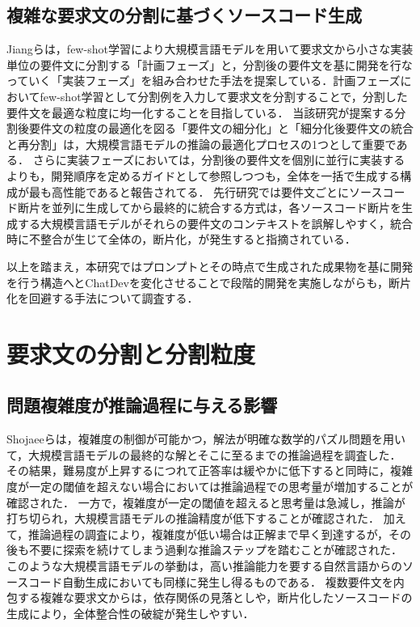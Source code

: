 \documentclass[11pt]{jreport}
\begin{document}
\subsection{複雑な要求文の分割に基づくソースコード生成}
Jiangら\cite{TOSEM}は，few-shot学習により大規模言語モデルを用いて要求文から小さな実装単位の要件文に分割する「計画フェーズ」と，分割後の要件文を基に開発を行なっていく「実装フェーズ」を組み合わせた手法を提案している．計画フェーズにおいてfew-shot学習として分割例を入力して要求文を分割することで，分割した要件文を最適な粒度に均一化することを目指している．
当該研究が提案する分割後要件文の粒度の最適化を図る「要件文の細分化」と「細分化後要件文の統合と再分割」は，大規模言語モデルの推論の最適化プロセスの1つとして重要である．
さらに実装フェーズにおいては，分割後の要件文を個別に並行に実装するよりも，開発順序を定めるガイドとして参照しつつも，全体を一括で生成する構成が最も高性能であると報告されてる．
先行研究では要件文ごとにソースコード断片を並列に生成してから最終的に統合する方式は，各ソースコード断片を生成する大規模言語モデルがそれらの要件文のコンテキストを誤解しやすく，統合時に不整合が生じて全体の，断片化，が発生すると指摘されている．

以上を踏まえ，本研究ではプロンプトとその時点で生成された成果物を基に開発を行う構造へとChatDevを変化させることで段階的開発を実施しながらも，断片化を回避する手法について調査する．


\section{要求文の分割と分割粒度}

\subsection{問題複雑度が推論過程に与える影響}
Shojaeeら\cite{Abandonment_of_Inference}は，複雑度の制御が可能かつ，解法が明確な数学的パズル問題を用いて，大規模言語モデルの最終的な解とそこに至るまでの推論過程を調査した．
その結果，難易度が上昇するにつれて正答率は緩やかに低下すると同時に，複雑度が一定の閾値を超えない場合においては推論過程での思考量が増加することが確認された．
一方で，複雑度が一定の閾値を超えると思考量は急減し，推論が打ち切られ，大規模言語モデルの推論精度が低下することが確認された．
加えて，推論過程の調査により，複雑度が低い場合は正解まで早く到達するが，その後も不要に探索を続けてしまう過剰な推論ステップを踏むことが確認された．
このような大規模言語モデルの挙動は，高い推論能力を要する自然言語からのソースコード自動生成においても同様に発生し得るものである．
複数要件文を内包する複雑な要求文からは，依存関係の見落としや，断片化したソースコードの生成により，全体整合性の破綻が発生しやすい．
\end{document}
